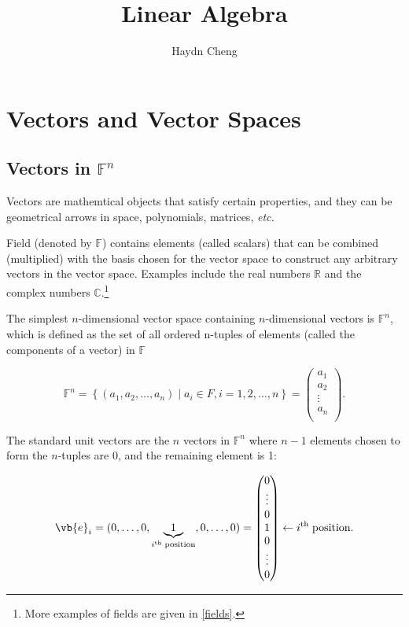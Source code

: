\documentclass[a4paper,12pt]{report}
\title{Linear Algebra}
\author{Haydn Cheng}
\date{}
\begin{document}
\maketitle
\tableofcontents


\chapter{Vectors and Vector Spaces}

\section{Vectors in \(\mathbb{F}^{n} \)}

Vectors are mathemtical objects that satisfy certain properties, and they can be geometrical arrows in space, polynomials, matrices, \textit{etc.} 

Field (denoted by \(\mathbb{F}\)) contains elements (called scalars) that can be combined (multiplied) with the basis chosen for the vector space to construct any arbitrary vectors in the vector space. Examples include the real numbers \(\mathbb{R}\) and the complex numbers \(\mathbb{C}\).\footnote{More examples of fields are given in \cref{fields}.} 

The simplest \(n\)-dimensional vector space containing \(n\)-dimensional vectors is \(\mathbb{F}^{n} \), which is defined as the set of all ordered n-tuples of elements (called the components of a vector) in \(\mathbb{F}\)

\begin{equation}
    \mathbb{F}^{n} = \left\{ (a_1 , a_2 ,\ldots ,a_{n} ) \mid a_{i} \in F, i = 1,2,\ldots ,n  \right\} = \begin{pmatrix}
         a_1   \\
         a_2  \\
         \vdots  \\
         a_{n}  \\
    \end{pmatrix}.
\end{equation}

The standard unit vectors are the \(n\) vectors in \(\mathbb{F}^{n} \) where \(n-1\) elements chosen to form the \(n\)-tuples are 0, and the remaining element is 1:  

\begin{equation}
    \vb{e} _{i} = (0,\ldots ,0,\underbrace{1}_{i^{\text{th }} \text{position} }, 0, \ldots , 0) = \begin{pmatrix}
         0 \\
         \vdots  \\
         0 \\
         1 \\
         0 \\
         \vdots  \\
         0 \\
    \end{pmatrix} \leftarrow i^{\text{th }}   \text{position}  .
\end{equation}
\end{document}

